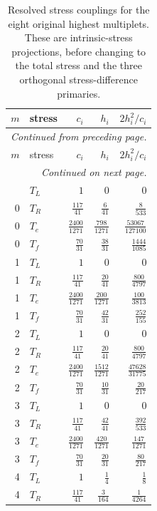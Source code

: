 \begingroup\small
\setlength{\tabcolsep}{5pt}
\begin{longtable}{rlrrr}
\caption{Resolved stress couplings for the eight original highest multiplets. These are intrinsic-stress projections, before changing to the total stress and the three orthogonal stress-difference primaries.}\label{expphysics:stress-ward}\\
\toprule
$m$ & stress & $c_i$ & $h_i$ & $2h_i^2/c_i$\\
\midrule
\endfirsthead
\multicolumn{5}{l}{\small\itshape Continued from preceding page.}\\
\toprule
$m$ & stress & $c_i$ & $h_i$ & $2h_i^2/c_i$\\
\midrule
\endhead
\midrule
\multicolumn{5}{r}{\small\itshape Continued on next page.}\\
\endfoot
\bottomrule
\endlastfoot
0 & $T_L$ & $1$ & $0$ & $0$\\
0 & $T_R$ & $\frac{117}{41}$ & $\frac{6}{41}$ & $\frac{8}{533}$\\
0 & $T_e$ & $\frac{2400}{1271}$ & $\frac{798}{1271}$ & $\frac{53067}{127100}$\\
0 & $T_f$ & $\frac{70}{31}$ & $\frac{38}{31}$ & $\frac{1444}{1085}$\\
1 & $T_L$ & $1$ & $0$ & $0$\\
1 & $T_R$ & $\frac{117}{41}$ & $\frac{20}{41}$ & $\frac{800}{4797}$\\
1 & $T_e$ & $\frac{2400}{1271}$ & $\frac{200}{1271}$ & $\frac{100}{3813}$\\
1 & $T_f$ & $\frac{70}{31}$ & $\frac{42}{31}$ & $\frac{252}{155}$\\
2 & $T_L$ & $1$ & $0$ & $0$\\
2 & $T_R$ & $\frac{117}{41}$ & $\frac{20}{41}$ & $\frac{800}{4797}$\\
2 & $T_e$ & $\frac{2400}{1271}$ & $\frac{1512}{1271}$ & $\frac{47628}{31775}$\\
2 & $T_f$ & $\frac{70}{31}$ & $\frac{10}{31}$ & $\frac{20}{217}$\\
3 & $T_L$ & $1$ & $0$ & $0$\\
3 & $T_R$ & $\frac{117}{41}$ & $\frac{42}{41}$ & $\frac{392}{533}$\\
3 & $T_e$ & $\frac{2400}{1271}$ & $\frac{420}{1271}$ & $\frac{147}{1271}$\\
3 & $T_f$ & $\frac{70}{31}$ & $\frac{20}{31}$ & $\frac{80}{217}$\\
4 & $T_L$ & $1$ & $\frac{1}{4}$ & $\frac{1}{8}$\\
4 & $T_R$ & $\frac{117}{41}$ & $\frac{3}{164}$ & $\frac{1}{4264}$\\

\end{longtable}
